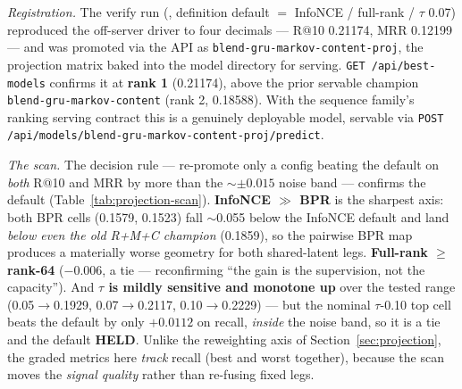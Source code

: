 \documentclass[11pt]{article}
\newcommand{\runid}[1]{\texttt{\small\seqsplit{#1}}}
\begin{document}
\emph{Registration.} The verify run
(\runid{run-20260718-191539-1b89c-seq-blend}, definition default $=$ InfoNCE /
full-rank / $\tau$ \num{0.07}) reproduced the off-server driver to four decimals
--- R@10 \num{0.21174}, MRR \num{0.12199} --- and was promoted via the API as
\texttt{blend-gru-markov-content-proj}, the projection matrix baked into the model
directory for serving. \texttt{GET /api/best-models} confirms it at \textbf{rank
1} (\num{0.21174}), above the prior servable champion
\texttt{blend-gru-markov-content} (rank 2, \num{0.18588}). With the sequence
family's ranking serving contract this is a genuinely deployable model, servable
via \texttt{POST /api/models/blend-gru-markov-content-proj/predict}.

\emph{The scan.} The decision rule --- re-promote only a config beating the default
on \emph{both} R@10 and MRR by more than the $\sim$$\pm\num{0.015}$ noise band ---
confirms the default (Table~\ref{tab:projection-scan}). \textbf{InfoNCE $\gg$ BPR}
is the sharpest axis: both BPR cells (\num{0.1579}, \num{0.1523}) fall
$\sim$\num{0.055} below the InfoNCE default and land \emph{below even the old R+M+C
champion} (\num{0.1859}), so the pairwise BPR map produces a materially worse
geometry for both shared-latent legs. \textbf{Full-rank $\ge$ rank-64}
($-\num{0.006}$, a tie --- reconfirming ``the gain is the supervision, not the
capacity''). And \textbf{$\tau$ is mildly sensitive and monotone up} over the
tested range (\num{0.05}$\to$\num{0.1929}, \num{0.07}$\to$\num{0.2117},
\num{0.10}$\to$\num{0.2229}) --- but the nominal $\tau$-\num{0.10} top cell beats
the default by only $+\num{0.0112}$ on recall, \emph{inside} the noise band, so it
is a tie and the default \textbf{HELD}. Unlike the reweighting axis of
Section~\ref{sec:projection}, the graded metrics here \emph{track} recall (best and
worst together), because the scan moves the \emph{signal quality} rather than
re-fusing fixed legs.
\end{document}

